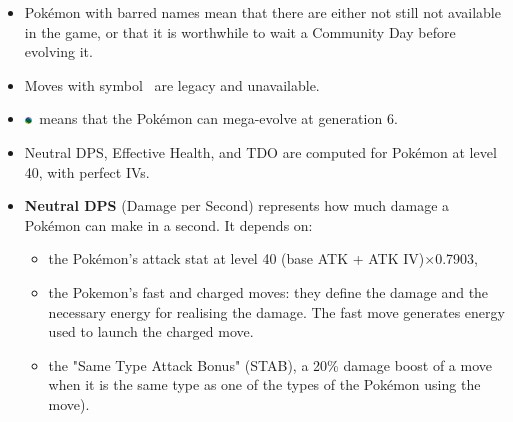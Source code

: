 \documentclass[12pt]{beamer}
\newcommand{\megaevol}{\includegraphics[width=0.2cm]{../../images/megaevolve}}
\begin{document}
\begin{frame}
\begin{block}{}
\begin{footnotesize}
\begin{itemize}
  \item Pok\'emon with barred names mean that there are either not still not available in the game, or that it is worthwhile to wait a Community Day before evolving it.
  \item Moves with symbol \dag~are legacy and unavailable.
  \item \megaevol~means that the Pok\'emon can mega-evolve at generation 6.
  \item Neutral DPS, Effective Health, and TDO are computed for Pok\'emon at level 40, with perfect IVs. 
  \item \textbf{Neutral DPS} (Damage per Second) represents how much damage a Pok\'emon can make in a second. It depends on:
  \begin{itemize}
  \item \footnotesize the Pok\'emon's attack stat at level 40 (base ATK + ATK IV)$\times$0.7903, 
  \item \footnotesize the Pokemon's fast and charged moves: they define the damage and the necessary energy for realising the damage. The fast move generates energy used to launch the charged move.
  \item \footnotesize the "Same Type Attack Bonus" (STAB), a 20\% damage boost of a move when it is the same type as one of the types of the Pokémon using the move). 
\end{itemize}

\begin{center}



\end{center}
\end{itemize}
\end{footnotesize}
\end{block}
\end{frame}
\end{document}
